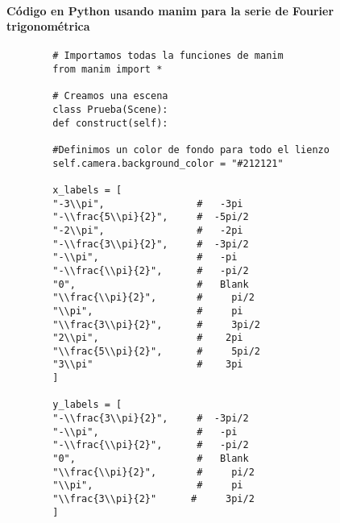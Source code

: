 \paragraph{Código en Python usando manim para la serie de Fourier trigonométrica} \label{app2:trig-code-python-manim}
\begin{longlisting}
	\begin{verbatim}
		# Importamos todas la funciones de manim
		from manim import *
		
		# Creamos una escena
		class Prueba(Scene):
		def construct(self):
		
		#Definimos un color de fondo para todo el lienzo
		self.camera.background_color = "#212121" 
		
		x_labels = [
		"-3\\pi",                #   -3pi
		"-\\frac{5\\pi}{2}",     #  -5pi/2
		"-2\\pi",                #   -2pi
		"-\\frac{3\\pi}{2}",     #  -3pi/2
		"-\\pi",                 #   -pi
		"-\\frac{\\pi}{2}",      #   -pi/2
		"0",                     #   Blank
		"\\frac{\\pi}{2}",       #     pi/2
		"\\pi",                  #     pi
		"\\frac{3\\pi}{2}",      #     3pi/2
		"2\\pi",                 #    2pi
		"\\frac{5\\pi}{2}",      #     5pi/2
		"3\\pi"                  #    3pi
		]
		
		y_labels = [
		"-\\frac{3\\pi}{2}",     #  -3pi/2
		"-\\pi",                 #   -pi
		"-\\frac{\\pi}{2}",      #   -pi/2
		"0",                     #   Blank
		"\\frac{\\pi}{2}",       #     pi/2
		"\\pi",                  #     pi
		"\\frac{3\\pi}{2}"      #     3pi/2	
		]
		

\end{verbatim}
\end{longlisting}
